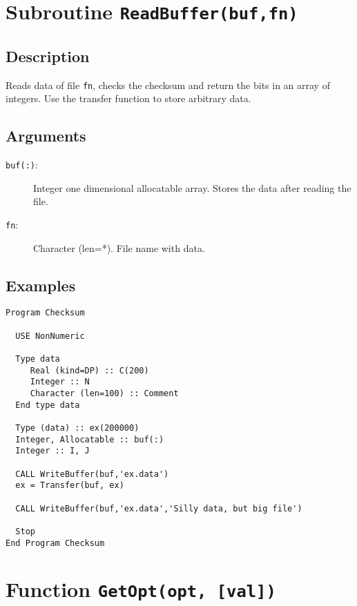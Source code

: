 \section{Subroutine \texttt{ReadBuffer(buf,fn)}}

\subsection{Description}

Reads data of file \texttt{fn}, checks the checksum and return the
bits in an array of integers. Use
the transfer function to store arbitrary data.

\subsection{Arguments}

\begin{description}
\item[\texttt{buf(:)}: ] Integer one dimensional allocatable
  array. Stores the data after reading the file.
\item[\texttt{fn}: ] Character (len=*). File name with data.
\end{description}

\subsection{Examples}

\begin{lstlisting}[emph=NumberOfColumns,
                   emphstyle=\color{blue},
                   frame=trBL,
                   caption=Reading data from file.,
                   label=nol]
Program Checksum
 
  USE NonNumeric
 
  Type data
     Real (kind=DP) :: C(200)
     Integer :: N
     Character (len=100) :: Comment
  End type data
 
  Type (data) :: ex(200000)
  Integer, Allocatable :: buf(:)
  Integer :: I, J
 
  CALL WriteBuffer(buf,'ex.data')
  ex = Transfer(buf, ex)
 
  CALL WriteBuffer(buf,'ex.data','Silly data, but big file')
 
  Stop
End Program Checksum
\end{lstlisting}

\section{Function \texttt{GetOpt(opt, [val])}}

